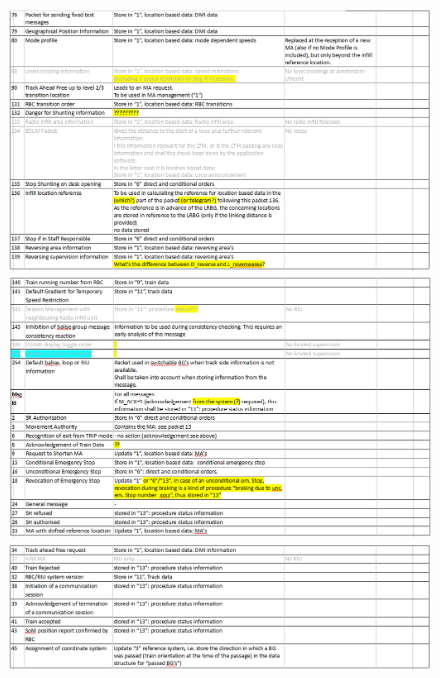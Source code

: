\documentclass{template/openetcs_report}
\begin{document}
\begin{figure}
\centering
\includegraphics[scale=0.4]{images/DataFlowUA3}
\centering
\includegraphics[scale=0.4]{images/DataFlowUA4}
\centering
\includegraphics[scale=0.4]{images/DataFlowUA5}
\end{figure}

\newpage
\end{document}
